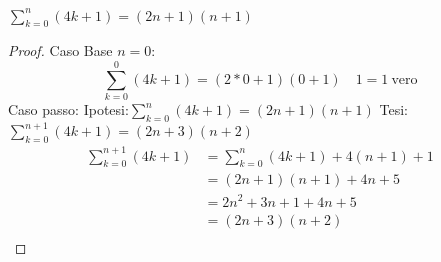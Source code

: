 \begin{thm}
$\sum _{k=0} ^ n (4k+1)= (2n+1)(n+1)$
\end{thm}

\begin{proof}
Caso Base $n = 0$:
\begin{equation*}
    \sum _{k = 0} ^ 0 (4k+1) = (2*0 +1)(0+1) \quad 1 = 1 \ \text{vero}
\end{equation*}
Caso passo:
\quad Ipotesi:$\sum _{k = 0} ^ n (4k+1) = (2n+1)(n+1)$\newline
\quad Tesi: $\sum _{k = 0} ^ {n+1} (4k+1) = (2n+3)(n+2)$
\begin{equation*}
\begin{split}
\sum _{k = 0} ^ {n+1} (4k+1) & = \sum _{k = 0} ^ n (4k+1) + 4(n+1) + 1 \\
                             & = (2n+1)(n+1) + 4n + 5\\
                             & = 2n^2+3n+1+4n+5 \\
                             & = (2n+3)(n+2)\\
\end{split}
\end{equation*}
\end{proof}
